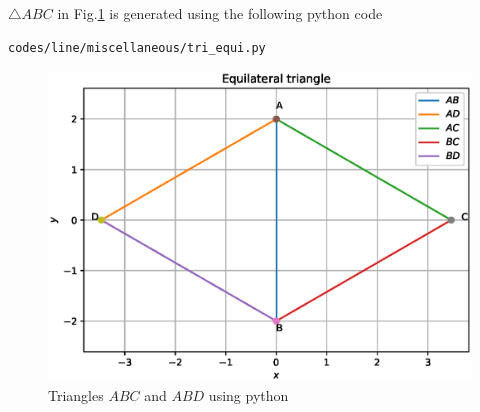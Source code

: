 \begin{enumerate}[label=\arabic*.,ref=\thesubsubsection.\theenumi]
\begin{enumerate}
$\triangle{ABC}$ in Fig.\ref{fig:tri_1}  is generated using the following python code
\begin{lstlisting}
codes/line/miscellaneous/tri_equi.py
\end{lstlisting}
\begin{figure}[!ht]
\centering
\includegraphics[width=\columnwidth]{./codes/line/miscellaneous/tri_equi.eps}
\caption{Triangles $ABC$ and $ABD$ using python}
\label{fig:tri_1}
\end{figure} 

\end{enumerate}

\end{enumerate}
